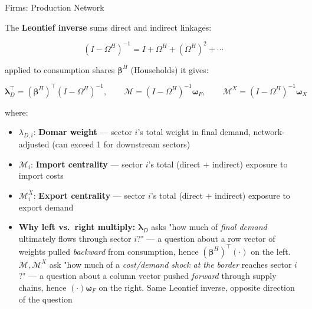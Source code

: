 \documentclass[aspectratio=43, 10pt]{beamer}
\begin{document}
\begin{frame}{Firms: Production Network}

\small

The \textbf{Leontief inverse} sums direct and indirect linkages:

\[
(I-\Omega^H)^{-1}=I+\Omega^H+(\Omega^H)^2+\cdots
\]

applied to consumption shares $\bm\beta^H$ (Households) it gives:

\[
\bm\lambda_D^\top=(\bm\beta^H)^\top(I-\Omega^H)^{-1},
\qquad
\mathcal M=(I-\Omega^H)^{-1}\bm\omega_F,
\qquad
\mathcal M^X=(I-\Omega^H)^{-1}\bm\omega_X
\]

\vspace{6pt}
{\footnotesize where:}

\vspace{2pt}
{\scriptsize
\begin{itemize}\setlength{\itemsep}{1pt}\setlength{\topsep}{0pt}
\item $\lambda_{D,i}$: \textbf{Domar weight} --- sector $i$'s total weight in final demand, network-adjusted (can exceed 1 for downstream sectors)
\item $\mathcal M_i$: \textbf{Import centrality} --- sector $i$'s total (direct $+$ indirect) exposure to import costs
\item $\mathcal M_i^X$: \textbf{Export centrality} --- sector $i$'s total (direct $+$ indirect) exposure to export demand
\item \textbf{Why left vs.\ right multiply:} $\bm\lambda_D$ asks "how much of \emph{final demand} ultimately flows through sector $i$?" --- a question about a row vector of weights pulled \emph{backward} from consumption, hence $(\bm\beta^H)^\top(\cdot)$ on the left. $\mathcal M,\mathcal M^X$ ask "how much of a \emph{cost/demand shock at the border} reaches sector $i$?" --- a question about a column vector pushed \emph{forward} through supply chains, hence $(\cdot)\bm\omega_F$ on the right. Same Leontief inverse, opposite direction of the question
\end{itemize}}

\end{frame}
\end{document}
